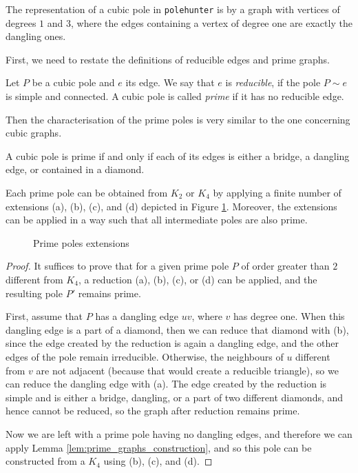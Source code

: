 The representation of a cubic pole in \texttt{polehunter} is by a graph with vertices of degrees $1$ and $3$, where the edges containing a vertex of degree one are exactly the dangling ones.

First, we need to restate the definitions of reducible edges and prime graphs.

\begin{definition}
    Let $P$ be a cubic pole and $e$ its edge. We say that $e$ is \emph{reducible}, if the pole $P\sim e$ is simple and connected. A cubic pole is called \emph{prime} if it has no reducible edge.
\end{definition}

Then the characterisation of the prime poles is very similar to the one concerning cubic graphs.

\begin{lemma}
    A cubic pole is prime if and only if each of its edges is either a bridge, a dangling edge, or contained in a diamond.
\end{lemma}

\begin{lemma}
    Each prime pole can be obtained from $K_2$ or $K_4$ by applying a finite number of extensions (a), (b), (c), and (d) depicted in Figure \ref{fig:prime_reductions_poles}. Moreover, the extensions can be applied in a way such that all intermediate poles are also prime.
    \begin{figure}[h!]\centering
        
        \caption{Prime poles extensions}
    \label{fig:prime_reductions_poles}
\end{figure}
\end{lemma}

\begin{proof}
    It suffices to prove that for a given prime pole $P$ of order greater than $2$ different from $K_4$, a reduction (a), (b), (c), or (d) can be applied, and the resulting pole $P'$ remains prime.
    
    First, assume that $P$ has a dangling edge $uv$, where $v$ has degree one. When this dangling edge is a part of a diamond, then we can reduce that diamond with (b), since the edge created by the reduction is again a dangling edge, and the other edges of the pole remain irreducible. Otherwise, the neighbours of $u$ different from $v$ are not adjacent (because that would create a reducible triangle), so we can reduce the dangling edge with (a). The edge created by the reduction is simple and is either a bridge, dangling, or a part of two different diamonds, and hence cannot be reduced, so the graph after reduction remains prime.
    
    Now we are left with a prime pole having no dangling edges, and therefore we can apply Lemma \ref{lem:prime_graphs_construction}, and so this pole can be constructed from a $K_4$ using (b), (c), and (d).
\end{proof}

